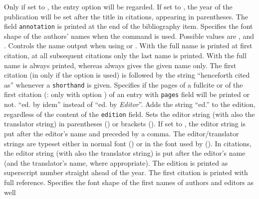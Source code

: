 \documentclass[english]{scrartcl}
\begin{document}
	  Only if set to , the entry option  will be regarded.
	  If set to , the year of the publication will be set after the title
	  in citations, appearing in parentheses.
	  The field \texttt{annotation} is printed at the end of the bibliography 
	  item.
	  Specifies the font shape of the authors' names when the 
	  command is used. Possible values are ,  and 
	  .
	  Controls the name output when using  or . With 
	   the full name is printed at first citation, at all 
	  subsequent citations only the last name is printed. With  the full name is 
	  always printed, whereas  always gives the given name only.
	  The first citation (in  only if the option 
	   is used) is followed by the string
	  \enquote{henceforth cited as} whenever a \texttt{shorthand} is given.
	  Specifies if the pages of a fullcite or of the first citation (: 
		only with option ) of an entry with \texttt{pages} field
		will be printed or not.
	  \enquote{ed. by idem} instead of \enquote{ed. by \emph{Editor}}.
    Adds the string \enquote{ed.} to the edition, regardless of the content of the 
    \texttt{edition} field.
	  Sets the editor string (with  also the
	  translator string) in parentheses () or brackets 
	  (). If set to , the editor string is
	  put after the editor's name and preceded by a comma.
    The editor\slash translator strings are typeset either in normal font () or
    in the font used by  ().
	  In citations, the editor string (with 
	  also the translator string) is put after the editor's name (and the
	  translator's name, where appropriate).
	  The edition is printed as superscript number straight ahead of the year.
    The first citation is printed with full reference.
	  Specifies the font shape of the first names of authors and editors as well 
\end{document}
